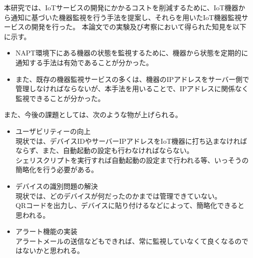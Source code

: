 本研究では、IoTサービスの開発にかかるコストを削減するために、IoT機器から通知に基づいた機器監視を行う手法を提案し、それらを用いたIoT機器監視サービスの開発を行った。
本論文での実験及び考察において得られた知見を以下に示す。
\begin{itemize}
	\item NAPT環境下にある機器の状態を監視するために、機器から状態を定期的に通知する手法は有効であることが分かった。
	\item また、既存の機器監視サービスの多くは、機器のIPアドレスをサーバー側で管理しなければならないが、本手法を用いることで、IPアドレスに関係なく監視できることが分かった。
\end{itemize}

また、今後の課題としては、次のような物が上げられる。
\begin{itemize}
	\item ユーザビリティーの向上\\
		現状では、デバイスIDやサーバーIPアドレスをIoT機器に打ち込まなければならず、また、自動起動の設定も行わなければならない。\\
		シェリスクリプトを実行すれば自動起動の設定まで行われる等、いっそうの簡略化を行う必要がある。
	\item デバイスの識別問題の解決\\
		現状では、どのデバイスが何だったのかまでは管理できていない。\\
		QRコードを出力し、デバイスに貼り付けるなどによって、簡略化できると思われる。
	\item アラート機能の実装\\
		アラートメールの送信などもできれば、常に監視していなくて良くなるのではないかと思われる。
\end{itemize}


